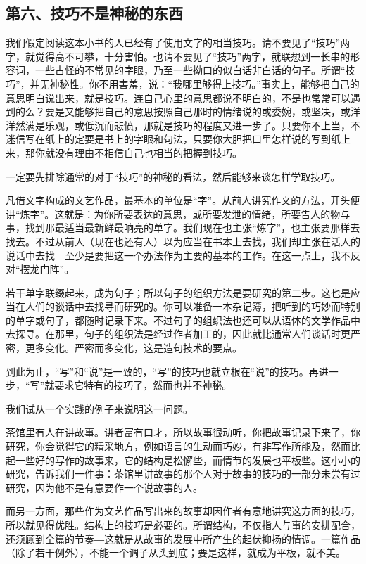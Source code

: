 \documentclass[fontset=fandol,12pt,a5paper]{ctexbook}
\begin{document}
\subsection{第六、技巧不是神秘的东西}
我们假定阅读这本小书的人已经有了使用文字的相当技巧。请不要见了“技巧”两字，就觉得高不可攀，十分害怕。也请不要见了“技巧”两字，就联想到一长串的形容词，一些古怪的不常见的字眼，乃至一些拗口的似白话非白话的句子。所谓“技巧”，并无神秘性。你不用害羞，说：“我哪里够得上技巧。”事实上，能够把自己的意思明白说出来，就是技巧。连自己心里的意思都说不明白的，不是也常常可以遇到的么？要是又能够把自己的意思按照自己那时的情绪说的或委婉，或坚决，或洋洋然满是乐观，或低沉而悲愤，那就是技巧的程度又进一步了。只要你不上当，不迷信写在纸上的定要是书上的字眼和句法，只要你大胆把口里怎样说的写到纸上来，那你就没有理由不相信自己也相当的把握到技巧。

一定要先排除通常的对于“技巧”的神秘的看法，然后能够来谈怎样学取技巧。

凡借文字构成的文艺作品，最基本的单位是“字”。从前人讲究作文的方法，开头便讲“炼字”。这就是：为你所要表达的意思，或所要发泄的情绪，所要告人的物与事，找到那最适当最新鲜最响亮的单字。我们现在也主张“炼字”，也主张要那样去找去。不过从前人（现在也还有人）以为应当在书本上去找，我们却主张在活人的说话中去找―至少是要把这一个办法作为主要的基本的工作。在这一点上，我不反对“摆龙门阵”。

若干单字联缀起来，成为句子；所以句子的组织方法是要研究的第二步。这也是应当在人们的谈话中去找寻而研究的。你可以准备一本杂记簿，把听到的巧妙而特别的单字或句子，都随时记录下来。不过句子的组织法也还可以从语体的文学作品中去探寻。在那里，句子的组织法是经过作者加工的，因此就比通常人们谈话时更严密，更多变化。严密而多变化，这是造句技术的要点。

到此为止，“写”和“说”是一致的，“写”的技巧也就立根在“说”的技巧。再进一步，“写”就要求它特有的技巧了，然而也并不神秘。

我们试从一个实践的例子来说明这一问题。

茶馆里有人在讲故事。讲者富有口才，所以故事很动听，你把故事记录下来了，你研究，你会觉得它的精采地方，例如语言的生动而巧妙，有非写作所能及，然而比起一些好的写作的故事来，它的结构是松懈些，而情节的发展也平板些。这小小的研究，告诉我们一件事：茶馆里讲故事的那个人对于故事的技巧的一部分未尝有过研究，因为他不是有意要作一个说故事的人。

而另一方面，那些作为文艺作品写出来的故事却因作者有意地讲究这方面的技巧，所以就见得优胜。结构上的技巧是必要的。所谓结构，不仅指人与事的安排配合，还须顾到全篇的节奏―这就是从故事的发展中所产生的起伏抑扬的情调。一篇作品（除了若干例外），不能一个调子从头到底；要是这样，就成为平板，就不美。
\end{document}
